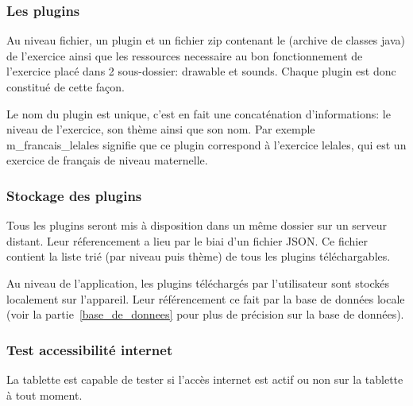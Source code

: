 \subsubsection{Les plugins}
Au niveau fichier, un plugin et un fichier \og{}zip\fg{} contenant le \jar{} (archive de classes java) de l'exercice ainsi que les ressources necessaire au bon fonctionnement de l'exercice placé dans 2 sous-dossier: \og{}drawable\fg{} et \og{}sounds\fg{}. Chaque plugin est donc constitué de cette façon.

Le nom du plugin est unique, c'est en fait une concaténation d'informations: le niveau de l'exercice, son thème ainsi que son nom. Par exemple \og{}m\_francais\_lelales\fg{} signifie que ce plugin correspond à l'exercice \og{}lelales\fg{}, qui est un exercice de français de niveau maternelle.

\subsubsection{Stockage des plugins}
\label{importation_plugin-stockage}
Tous les plugins seront mis à disposition dans un même dossier sur un serveur distant. Leur réferencement a lieu par le biai d'un fichier JSON. Ce fichier contient la liste trié (par niveau puis thème) de tous les plugins téléchargables.

Au niveau de l'application, les plugins téléchargés par l'utilisateur sont stockés localement sur l'appareil. Leur référencement ce fait par la base de données locale (voir la partie~\ref{base_de_donnees} pour plus de précision sur la base de données).

\subsubsection{Test accessibilité internet}
La tablette est capable de tester si l'accès internet est actif ou non sur la tablette à tout moment.

